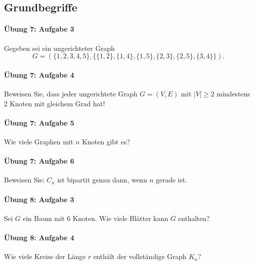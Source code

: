 \documentclass
[
  draft    = true,
  fontsize = 11pt,
  parskip  = half-,
  BCOR     = 0pt,
  DIV      = 11,
  ngerman,
  dvipsnames
]
{scrartcl}
\begin{document}
\subsection{Grundbegriffe}

\paragraph{Übung 7: Aufgabe 3}
Gegeben sei ein ungerichteter Graph
\begin{equation*}
  G=(\{1,2,3,4,5\},\{\{1,2\},\{1,4\},\{1,5\},\{2,3\},\{2,5\},\{3,4\}\}).
\end{equation*}

\paragraph{Übung 7: Aufgabe 4}
Beweisen Sie, dass jeder ungerichtete Graph $G=(V,E)$ mit $|V|\geq2$
mindestens 2 Knoten mit gleichem Grad hat!

\paragraph{Übung 7: Aufgabe 5}
Wie viele Graphen mit $n$ Knoten gibt es?

\paragraph{Übung 7: Aufgabe 6}
Beweisen Sie: $C_n$ ist bipartit genau dann, wenn $n$ gerade ist.

\paragraph{Übung 8: Aufgabe 3}
Sei $G$ ein Baum mit 6 Knoten. Wie viele Blätter kann $G$ enthalten?

\paragraph{Übung 8: Aufgabe 4}
Wie viele Kreise der Länge $r$ enthält der vollständige Graph $K_n$?
\end{document}
